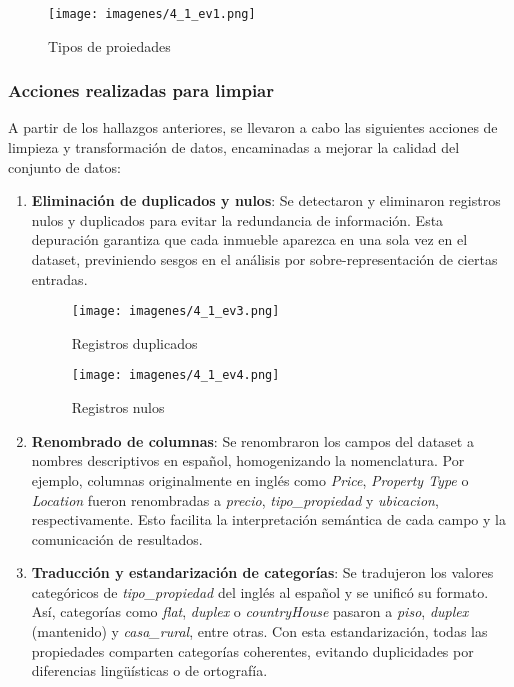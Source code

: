 \documentclass[a4paper,11pt]{book}
\begin{document}
\begin{figure}
    \centering
    \texttt{[image: imagenes/4\_1\_ev1.png]}
    \caption{Tipos de proiedades}
    \label{fig:tipos-propiedad}
\end{figure}


\subsubsection{Acciones realizadas para limpiar}
A partir de los hallazgos anteriores, se llevaron a cabo las siguientes acciones de limpieza y transformación de datos, encaminadas a mejorar la calidad del conjunto de datos:

\begin{enumerate}
\item \textbf{Eliminación de duplicados y nulos}: Se detectaron y eliminaron registros nulos y   duplicados para evitar la redundancia de información. Esta depuración garantiza que cada inmueble aparezca en una sola vez en el dataset, previniendo sesgos en el análisis por sobre-representación de ciertas entradas.

\begin{figure}
    \centering
    \texttt{[image: imagenes/4\_1\_ev3.png]}
    \caption{Registros duplicados}
\end{figure}

\begin{figure}
    \centering
    \texttt{[image: imagenes/4\_1\_ev4.png]}
    \caption{Registros nulos}
\end{figure}

\item \textbf{Renombrado de columnas}: Se renombraron los campos del dataset a nombres descriptivos en español, homogenizando la nomenclatura. Por ejemplo, columnas originalmente en inglés como \emph{Price}, \emph{Property Type} o \emph{Location} fueron renombradas a \emph{precio}, \emph{tipo\_propiedad} y \emph{ubicacion}, respectivamente. Esto facilita la interpretación semántica de cada campo y la comunicación de resultados.

\item \textbf{Traducción y estandarización de categorías}: Se tradujeron los valores categóricos de \emph{tipo\_propiedad} del inglés al español y se unificó su formato. Así, categorías como \emph{flat}, \emph{duplex} o \emph{countryHouse} pasaron a \emph{piso}, \emph{duplex} (mantenido) y \emph{casa\_rural}, entre otras. Con esta estandarización, todas las propiedades comparten categorías coherentes, evitando duplicidades por diferencias lingüísticas o de ortografía.


\end{enumerate}
\end{document}

